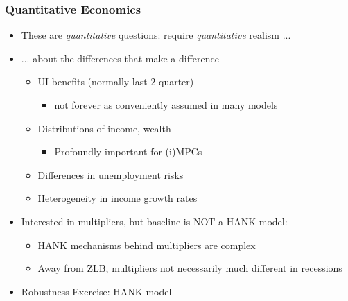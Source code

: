 \documentclass[pdflatex,aspectratio=169]{beamer}
\begin{document}
\begin{frame}
  \frametitle{Quantitative Economics}
  \begin{itemize}[<+->]
  	\itemsep = .75\bigskipamount 
    \item These are \textit{quantitative} questions: require \textit{quantitative} realism ...
    \item ... about the differences that make a difference
    \begin{itemize}[<+->]
    \itemsep = .25\bigskipamount 
  \item UI benefits (normally last 2 quarter)
\begin{itemize}    \item not forever as conveniently assumed in many models
\end{itemize}
    \item Distributions of income, wealth
      \begin{itemize}
      \item Profoundly important for (i)MPCs
      \end{itemize} 
      \item Differences in unemployment risks
      \item Heterogeneity in income growth rates
  \end{itemize}
\end{itemize}


\begin{itemize}[<+->]
  \item Interested in multipliers, but baseline is NOT a HANK model:
    \begin{itemize}[<+->]
    \itemsep = .25\bigskipamount 	
    \item HANK mechanisms behind multipliers are complex
    \item Away from ZLB, multipliers not necessarily much different in recessions
    \end{itemize}
  \end{itemize}
  
  \begin{itemize}[<+->]
    \itemsep = .25\bigskipamount 
    \item Robustness Exercise: HANK model 
    \end{itemize}
\end{frame}
\end{document}

